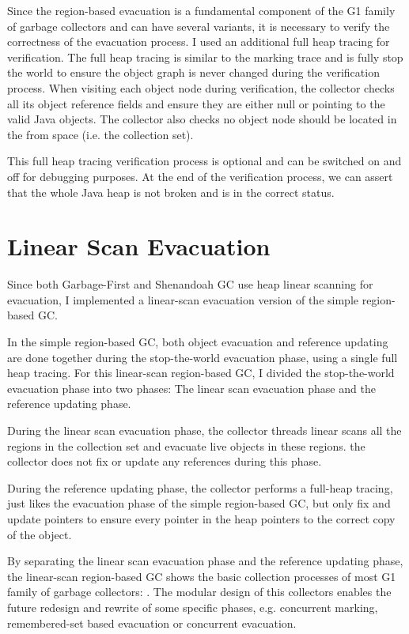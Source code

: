 Since the region-based evacuation is a fundamental component of the G1 family of garbage collectors
and can have several variants, it is necessary to verify the correctness of the evacuation process.
I used an additional full heap tracing for verification. The full heap tracing is
similar to the marking trace and is fully stop the world to ensure the object graph is never changed
during the verification process.
When visiting each object node during verification, the collector checks all its object reference fields
and ensure they are either null or pointing to the valid Java objects.
The collector also checks no object node should be located in the from space (i.e. the collection set).

This full heap tracing verification process is optional and can be switched on and off for
debugging purposes.
At the end of the verification process, we can assert that the whole Java heap is
not broken and is in the correct status.

\section{Linear Scan Evacuation}
\label{sec:linearscangc}

Since both Garbage-First and Shenandoah GC use heap linear scanning for evacuation,
I implemented a linear-scan evacuation version of the simple region-based GC.

In the simple region-based GC, both object evacuation and reference updating are
done together during the stop-the-world evacuation phase, using a single full heap tracing.
For this linear-scan region-based GC, I divided the stop-the-world evacuation phase into
two phases: The linear scan evacuation phase and the reference updating phase.

During the linear scan evacuation phase, the collector threads linear scans all the regions
in the collection set and evacuate live objects in these regions. the collector does not
fix or update any references during this phase.

During the reference updating phase, the collector performs a full-heap tracing,
just likes the evacuation phase of the simple region-based GC, but only fix and update
pointers to ensure every pointer in the heap pointers to the correct copy of the object.

By separating the linear scan evacuation phase and the reference updating phase,
the linear-scan region-based GC shows the basic collection processes of most G1 family
of garbage collectors: .
The modular design of this collectors enables the future redesign and rewrite of some specific
phases, e.g. concurrent marking, remembered-set based evacuation or concurrent evacuation.

